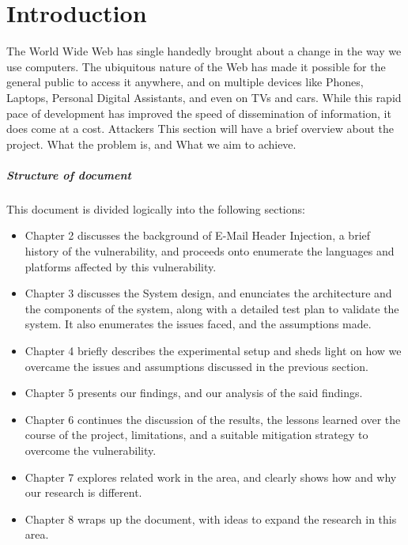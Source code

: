 \chapter{Introduction}
	The World Wide Web has single handedly brought about a change in the way we use computers. The ubiquitous nature of the Web has made it possible for the general public to access it anywhere, and on multiple devices like Phones, Laptops, Personal Digital Assistants, and even on TVs and cars. While this rapid pace of development has improved the speed of dissemination of information, it does come at a cost. Attackers 
	\cite{Injection}
	This section will have a brief overview about the project. What the problem is, and What we aim to achieve.

\paragraph{Structure of document} %
This document is divided logically into the following sections:
\begin{itemize}
	\item Chapter 2 discusses the background of E-Mail Header Injection, a brief history of the vulnerability, and proceeds onto enumerate the languages and platforms affected by this vulnerability.%
	
	\item Chapter 3 discusses the System design, and enunciates the architecture and the components of the system, along with a detailed test plan to validate the system. It also enumerates the issues faced, and the assumptions made.
	
	\item Chapter 4 briefly describes the experimental setup and sheds light on how we overcame the issues and assumptions discussed in the previous section.
	
	\item Chapter 5 presents our findings, and our analysis of the said findings.
	
	\item Chapter 6 continues the discussion of the results, the lessons learned over the course of the project, limitations, and a suitable mitigation strategy to overcome the vulnerability.
	
	\item Chapter 7 explores related work in the area, and clearly shows how and why our research is different.
	
	\item Chapter 8 wraps up the document, with ideas to expand the research in this area.
\end{itemize} 

